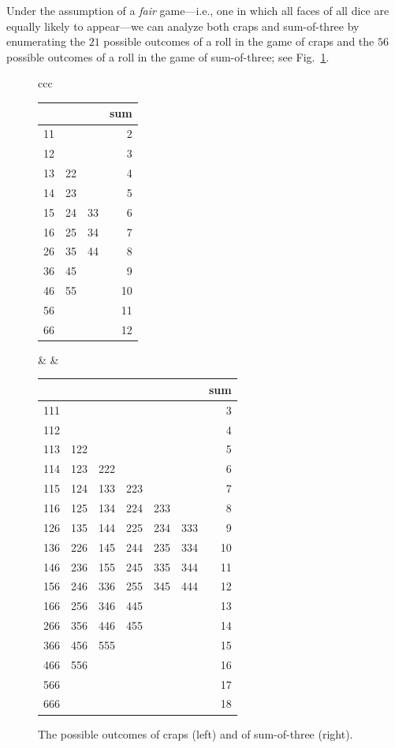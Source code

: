 Under the assumption of a {\em fair} game---i.e., one in which all faces of all dice are equally likely to appear---we can analyze both craps and sum-of-three by enumerating the $21$ possible outcomes of a roll in the game of craps and the $56$ possible outcomes of a roll in the game of sum-of-three; see Fig.~\ref{fig:dice-outcomes}.
\begin{figure}[htb]
\begin{center}
\begin{tabular}{ccc}
\begin{tabular}{|c|c|c|r|}
\hline
   &    &    & sum \\
\hline
11 &    &    & 2 \\
12 &    &    & 3 \\
13 & 22 &    & 4 \\
14 & 23 &    & 5 \\
15 & 24 & 33 & 6 \\
16 & 25 & 34 & 7 \\
26 & 35 & 44 & 8 \\
36 & 45 &    & 9 \\
46 & 55 &    & 10 \\
56 &    &    & 11 \\
66 &    &    & 12 \\
\hline
\end{tabular}
  &
\hspace*{.5in}
  &
\begin{tabular}{|c|c|c|c|c|c|r|}
\hline
 & & & & & & sum\\
\hline
111 & & & & & & 3\\
112 & & & & & & 4\\
113 & 122 & & & & & 5 \\
114 & 123 & 222 & & & & 6 \\
115 & 124 & 133 & 223 & & & 7\\
116 & 125 & 134 &  224 & 233 & & 8\\
126 & 135 & 144 & 225 & 234 & 333 & 9\\
136 &  226 & 145 & 244 & 235 & 334 & 10\\
146 & 236 & 155 & 245 & 335 & 344 & 11\\
156 & 246 & 336 & 255 & 345 & 444 & 12\\
166 & 256 & 346 & 445 & & & 13\\
266 & 356 & 446 & 455 & & & 14\\
366 & 456 & 555 & & & & 15\\
466 & 556 & & & & & 16\\
566 & & & & & & 17\\
666 & & & & & & 18\\
\hline
\end{tabular}
\end{tabular}
\end{center}
\caption{The possible outcomes of craps (left) and of sum-of-three (right).}
\label{fig:dice-outcomes}
\end{figure}

